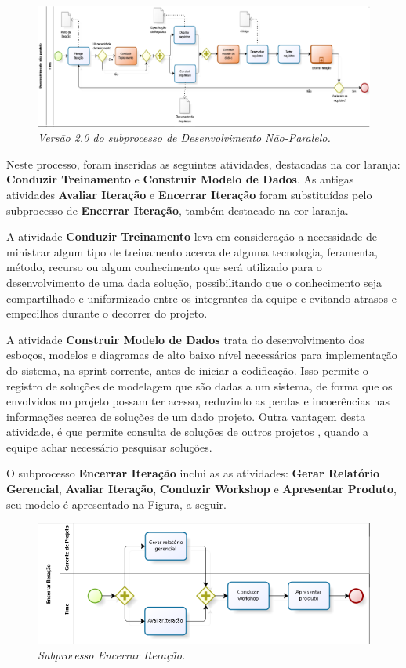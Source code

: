 \begin{figure}[H]
\centering\includegraphics[scale=0.4]{figuras/subprocessoDevNaoParalelo2.png}
\caption{\textit{Versão 2.0 do subprocesso de Desenvolvimento Não-Paralelo.}}
\end{figure}

Neste processo, foram inseridas as seguintes atividades, destacadas na cor laranja: \textbf{Conduzir Treinamento} e \textbf{Construir Modelo de Dados}. As antigas atividades \textbf{Avaliar Iteração} e \textbf{Encerrar Iteração} foram substituídas pelo subprocesso de \textbf{Encerrar Iteração}, também destacado na cor laranja.

A atividade \textbf{Conduzir Treinamento} leva em consideração a necessidade de ministrar algum tipo de treinamento acerca de alguma tecnologia, feramenta, método, recurso ou algum conhecimento que será utilizado para o desenvolvimento de uma dada solução, possibilitando que o conhecimento seja compartilhado e uniformizado entre os integrantes da equipe e evitando atrasos e empecilhos durante o decorrer do projeto.

A atividade \textbf{Construir Modelo de Dados} trata do desenvolvimento dos esboços, modelos e diagramas de alto  baixo nível necessários para implementação do sistema, na sprint corrente, antes de iniciar a codificação. Isso permite o registro de soluções de modelagem que são dadas a um sistema, de forma que os envolvidos no projeto possam ter acesso, reduzindo as perdas e incoerências nas informações acerca de soluções de um dado projeto. Outra vantagem desta atividade, é que permite consulta de soluções de outros projetos , quando a equipe achar necessário pesquisar soluções.

O subprocesso \textbf{Encerrar Iteração} inclui as as atividades: \textbf{Gerar Relatório Gerencial}, \textbf{Avaliar Iteração}, \textbf{Conduzir Workshop} e \textbf{Apresentar Produto}, seu modelo é apresentado na Figura, a seguir.

\begin{figure}[H]
\centering\includegraphics[scale=0.5]{figuras/encerrarIteracao.png}
\caption{\textit{Subprocesso Encerrar Iteração.}}
\end{figure}

